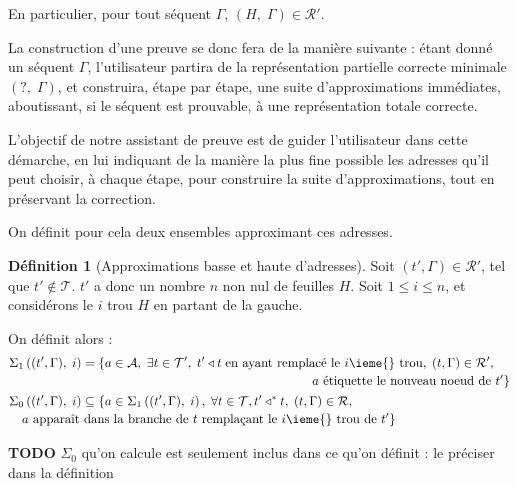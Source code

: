 \documentclass[11pt,a4paper]{article}
\theoremstyle{plain}
\theoremstyle{definition}
\newtheorem{definition}{Définition}
\theoremstyle{remark}
\newcommand*{\sequent}{\Gamma}
\newcommand*{\addresses}{\ensuremath{\mathcal{A}}}
\newcommand*{\trees}{\ensuremath{\mathcal{T}}}
\newcommand*{\treespartial}{\ensuremath{\mathcal{T'}}}
\newcommand*{\representations}{\ensuremath{\mathcal{R}}}
\newcommand*{\representationspartial}{\ensuremath{\mathcal{R'}}}
\newcommand*{\relapprox}{\ensuremath{\triangleleft}}
\newcommand*{\relapproxlarge}{\ensuremath{\relapprox^*}}
\newcommand*{\unknown}{H}
\newcommand*{\lowapprox}{\ensuremath{\Sigma_0}}
\newcommand*{\highapprox}{\ensuremath{\Sigma_1}}
\newcommand*{\todo}{{\normalfont \textbf{TODO}} }
\begin{document}
En particulier, pour tout séquent $\sequent$, $(\unknown, \; \sequent) \in \representationspartial$.

La construction d'une preuve se donc fera de la manière suivante : étant donné un séquent $\sequent$, l'utilisateur partira de la représentation partielle correcte minimale $(?, \; \sequent)$, et construira, étape par étape, une suite d'approximations immédiates, aboutissant, si le séquent est prouvable, à une représentation totale correcte.

L'objectif de notre assistant de preuve est de guider l'utilisateur dans cette démarche, en lui indiquant de la manière la plus fine possible les adresses qu'il peut choisir, à chaque étape, pour construire la suite d'approximations, tout en préservant la correction.

On définit pour cela deux ensembles approximant ces adresses.

\begin{definition}[Approximations basse et haute d'adresses]
    Soit $(t', \sequent) \in \representationspartial$, tel que $t' \notin \trees$. $t'$ a donc un nombre $n$ non nul de feuilles $\unknown$. Soit $1 \leq i \leq n$, et considérons le $i$\ieme{} trou $\unknown$ en partant de la gauche.

    On définit alors :
    \begin{align*}
        & \begin{multlined}
            \highapprox \left( (t', \sequent), \; i \right) = \{ a \in \addresses, \; \exists t \in \treespartial, \; t' \relapprox t \; \text{en ayant remplacé le $i$\ieme{} trou}, \; (t, \sequent) \in \representationspartial, \; \\
            \text{$a$ étiquette le nouveau noeud de $t'$} \}
        \end{multlined}\\
        & \begin{multlined}
            \lowapprox \left( (t', \sequent), \; i \right) \subseteq \{ a \in \highapprox \left( (t', \sequent), \; i \right), \; \forall t \in \trees, t' \relapproxlarge t, \; (t, \sequent) \in \representations, \; \\
            \text{$a$ apparaît dans la branche de $t$ remplaçant le $i$\ieme{} trou de $t'$}
            \}
        \end{multlined}
    \end{align*} 
\end{definition}

\todo{$\lowapprox$ qu'on calcule est seulement inclus dans ce qu'on définit : le préciser dans la définition}
\end{document}
